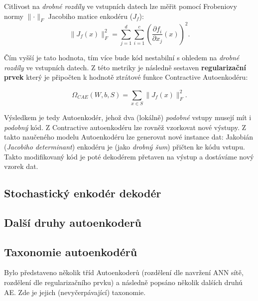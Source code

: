 Citlivost na \emph{drobné rozdíly} ve vstupních datech lze měřit pomocí Frobeniovy normy $\lVert \cdot \rVert_F$ Jacobiho matice enkodéru ($J_f$):
\begin{equation}
    \lVert J_f(x) \rVert^2_F = \sum_{j=1}^{d}\sum_{i=1}^{c} \left( \frac{\partial f_i}{\partial x_j} (x) \right) ^2 .
\end{equation}

Čím vyšší je tato hodnota, tím více bude kód nestabilní s ohledem na \emph{drobné rozdíly} ve vstupních datech.
Z této metriky je následně sestaven \textbf{regularizační prvek} který je připočten k hodnotě ztrátové funkce Contractive Autoenkodéru:

\begin{equation}
    \Omega_{CAE} (W, b, S) = \sum_{x \in S}^{} \lVert J_f(x) \rVert^2_F .
\end{equation}

Výsledkem je tedy Autoenkodér, jehož dva (lokálně) \emph{podobné} vstupy musejí mít i \emph{podobný} kód.
Z Contractive autoenkodéru lze rovněž vzorkovat nové výstupy.
Z takto naučeného modelu Autoenkodéru lze generovat nové instance dat:
Jakobián (\emph{Jacobiho determinant}) enkodéru je (jako \emph{drobný šum}) přičten ke kódu vstupu.
Takto modifikovaný kód je poté dekodérem přetaven na výstup a dostáváme nový vzorek dat.


\subsection{Stochastický enkodér dekodér}
\subsection{Další druhy autoenkoderů}
\subsection{Taxonomie autoenkodérů}
Bylo představeno několik tříd Autoenkoderů (rozdělení dle navržení ANN sítě, rozdělení dle regularizačního prvku) a následně popsáno několik dalśích druhú AE.
Zde je jejich (nevyčerpávající) taxonomie.

